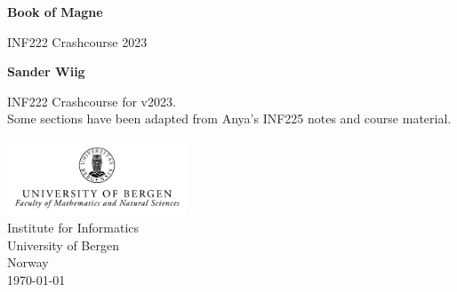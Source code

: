 
\begin{titlepage}
    \begin{center}
        \vspace*{1cm}

        \huge
        \textbf{Book of Magne}

        \vspace{0.5cm}
        \LARGE
        INF222 Crashcourse 2023
            
        \vspace{1.5cm}

        \textbf{Sander Wiig}

        \vfill
        
        \Large
        INF222 Crashcourse for v2023.\\
        Some sections have been adapted from Anya's INF225 notes and course material.
            
        \vspace{0.5cm}
    
        \includegraphics[width=0.4\textwidth]{assets/UiBlogoMN_gray_m_Eng.png}\\
        \Large
        Institute for Informatics\\
        University of Bergen\\
        Norway\\
        \today
            
    \end{center}
\end{titlepage}